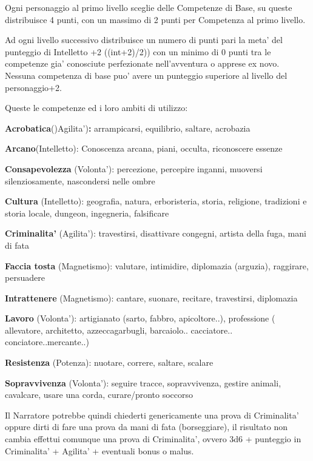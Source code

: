 \documentclass[a4paper,11pt,twoside,openany]{book}
\begin{document}
	Ogni personaggio al primo livello sceglie delle Competenze di Base, su queste distribuisce 4 punti, con un massimo di 2 punti per Competenza al primo livello.
	
	Ad ogni livello successivo distribuisce un numero di punti pari la meta' del punteggio di Intelletto +2 ((int+2)/2)) con un minimo di 0 punti tra le competenze gia' conosciute perfezionate nell'avventura o apprese ex novo. Nessuna competenza di base puo' avere un  punteggio superiore al livello del personaggio+2.
	
	\bigskip
	
	Queste le competenze ed i loro ambiti di utilizzo:
	
	\textbf{Acrobatica}()Agilita')\textbf{:} arrampicarsi, equilibrio, saltare, acrobazia
	
	\textbf{Arcano}(Intelletto): Conoscenza arcana, piani, occulta, riconoscere essenze
	
	\textbf{Consapevolezza} (Volonta'): percezione, percepire inganni, muoversi silenziosamente, nascondersi nelle ombre
	
	\textbf{Cultura} (Intelletto): geografia, natura, erboristeria, storia, religione, tradizioni e storia locale, dungeon, ingegneria, falsificare
	
	\textbf{Criminalita'} (Agilita'): travestirsi, disattivare congegni, artista della fuga, mani di fata
	
	\textbf{Faccia tosta} (Magnetismo): valutare, intimidire, diplomazia (arguzia), raggirare, persuadere
	
	\textbf{Intrattenere} (Magnetismo): cantare, suonare, recitare, travestirsi, diplomazia
	
	\textbf{Lavoro} (Volonta'): artigianato (sarto, fabbro, apicoltore..), professione ( allevatore, architetto, azzeccagarbugli, barcaiolo.. cacciatore.. conciatore..mercante..)
	
	\textbf{Resistenza} (Potenza): nuotare, correre, saltare, scalare
	
	\textbf{Sopravvivenza} (Volonta'): seguire tracce, sopravvivenza, gestire animali, cavalcare, usare una corda, curare/pronto soccorso
	
	\bigskip
	
	Il Narratore potrebbe quindi chiederti genericamente una prova di Criminalita' oppure dirti di fare una prova da mani di fata (borseggiare), il risultato non cambia effettui comunque una prova di Criminalita', ovvero 3d6 + punteggio in Criminalita' + Agilita' + eventuali bonus
	o malus.
	
\end{document}
